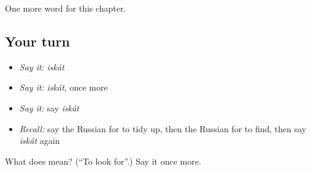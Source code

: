 \begin{grammarlens}[title={What you've built}]
One more word for this chapter.
\end{grammarlens}

\subsection*{Your turn}
\begin{itemize}
\raggedright
  \item \emph{Say it:} \emph{iskát}
  \item \emph{Say it:} \emph{iskát}, once more
  \item \emph{Say it:} say \emph{iskát}
  \item \emph{Recall:} say the Russian for to tidy up, then the Russian for to find, then say \emph{iskát} again
\end{itemize}

\begin{tcolorbox}[breakable,colback=teal!4,colframe=teal!35!black,title={Before you move on}]
What does  mean? (\textquotedblleft{}To look for\textquotedblright{}.) Say it once more.
\end{tcolorbox}
